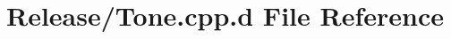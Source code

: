 \hypertarget{_release_2_tone_8cpp_8d}{\section{\-Release/\-Tone.cpp.\-d \-File \-Reference}
\label{_release_2_tone_8cpp_8d}
}
